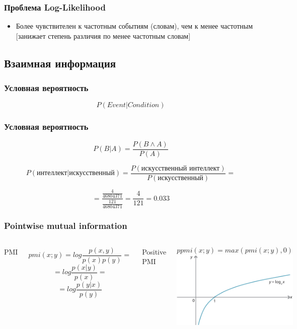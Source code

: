 \documentclass[svgnames]{beamer}
\begin{document}
\begin{frame}
  \frametitle{Проблема Log-Likelihood}
  \begin{itemize}
  \item Более чувствителен к частотным событиям (словам), чем к менее
    частотным [занижает степень различия по менее частотным словам]
  \end{itemize}
\end{frame}

\subsection{Взаимная информация}

\begin{frame}
  \frametitle{Условная вероятность}
$$
    P(Event|Condition)
$$
\end{frame}

\begin{frame}
  \frametitle{Условная вероятность}
  \begin{equation}
    P(B|A) = \frac{P(B \land A)}{P(A)}
  \end{equation}

  $$
    P(\text{интеллект}|\text{искусственный}) =
    \frac{P(\text{искусственный интеллект})}{P(\text{искусственный})}
    =$$

    $$
    = \frac{\frac{4}{46804371}}{\frac{121}{46804371}} = \frac{4}{121} = 0.033$$
\end{frame}

\begin{frame}
  \frametitle{Pointwise mutual information}
  \begin{columns}
    PMI

  $$
  pmi(x;y) = log \frac{p(x,y)}{p(x)p(y)} =
  $$
  $$
  = log \frac{p(x|y)}{p(x)} =
  $$
  $$
  = log \frac{p(y|x)}{p(y)}
  $$

  Positive PMI

    $$
    ppmi(x;y) = max(pmi(x;y),0)
    $$    
  \includegraphics[width=\textwidth]{log}
  \end{columns}
\end{frame}
\end{document}
